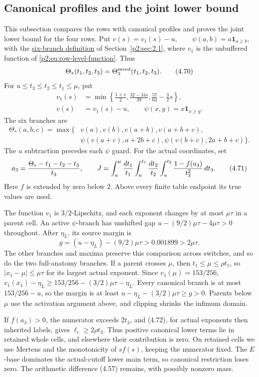 \subsection{Canonical profiles and the joint lower bound}

This subsection compares the rows with canonical profiles and proves the joint lower bound for the four rows.
Put
$v(s)=v_1(s)-u,\qquad \psi(a,b)=a\mathbf1_{a\ge b},$
with the \hyperlink{p2:def:six-branch-saved}{six-branch definition}
of Section~\ref{p2:sec:2.1}, where $v_1$ is the unbuffered function of \eqref{p2:eq:row-level-function}.
Thus
\[
 \Theta_*(t_1,t_2,t_3)=\Theta_3^{\rm saved}(t_1,t_2,t_3).
 \tag{4.70}
\]
For $u\le t_3\le t_2\le t_1\le\mu$, put
\[
\begin{aligned}
v_1(s)&=\min\left\{\frac{1+s}{2},\frac{32-34s}{39},
                     \frac{57}{64}-\frac32s\right\},\\
v(s)&=v_1(s)-u,\qquad \psi(x,y)=x\mathbf1_{x\ge y}.
\end{aligned}
\]
The six branches are
\[
\begin{aligned}
\Theta_*(a,b,c)=\max\{&v(a),v(b),v(a+b),v(a+b+c),\\
 &\psi(v(a+c),a+2b+c),\psi(v(b+c),2a+b+c)\}.
\end{aligned}
\]
The $u$ subtraction precedes each $\psi$ guard.
For the actual coordinates, set
\[
 a_3={\Theta_*-t_1-t_2-t_3\over t_3},\qquad
 J=\int_u^\mu{dt_1\over t_1}\int_u^{t_1}{dt_2\over t_2}
                  \int_u^{t_2}{1-f(a_3)\over t_3^2}\,dt_3.
 \tag{4.71}
\]
Here $f$ is extended by zero below 2.
Above every finite table endpoint its true values are used.

The function $v_1$ is $3/2$-Lipschitz, and each exponent changes by at most $\mu\tau$ in a parent cell.
An active $\psi$-branch has unshifted gap $u-(9/2)\mu\tau-4\mu\tau>0$ throughout.
After $\eta_L$, its source margin is
\[
 g=(u-\eta_L)-(9/2)\mu\tau>0.001899>2\mu\tau.
 \tag{4.72}
\]
The other branches and maxima preserve this comparison across switches, and so do the two full-anatomy branches.
If a parent crosses $\mu$, then $t_1\le\mu\le\rho t_1$, so $|x_1-\mu|\le\mu\tau$ for its largest actual exponent.
Since $v_1(\mu)=153/256$,
$v_1(x_1)-\eta_L\ge153/256-(3/2)\mu\tau-\eta_L$.
Every canonical branch is at most $153/256-u$, so the margin is at least $u-\eta_L-(3/2)\mu\tau\ge g>0$.
Parents below $\mu$ use the activation argument above, and clipping shrinks the infimum domain.

If $f(a_3)>0$, the numerator exceeds $2t_3$,
and (4.72), for actual exponents then inherited labels, gives $\ell_c\ge2\rho t_3$.
Thus positive canonical lower terms lie in retained whole cells, and elsewhere their contribution is zero.
On retained cells we use Mertens and the monotonicity of $sf(s)$, keeping the numerator fixed.
The $E$-base dominates the actual-cutoff lower main term, so canonical restriction loses zero.
The arithmetic difference (4.57) remains, with possibly nonzero mass.

